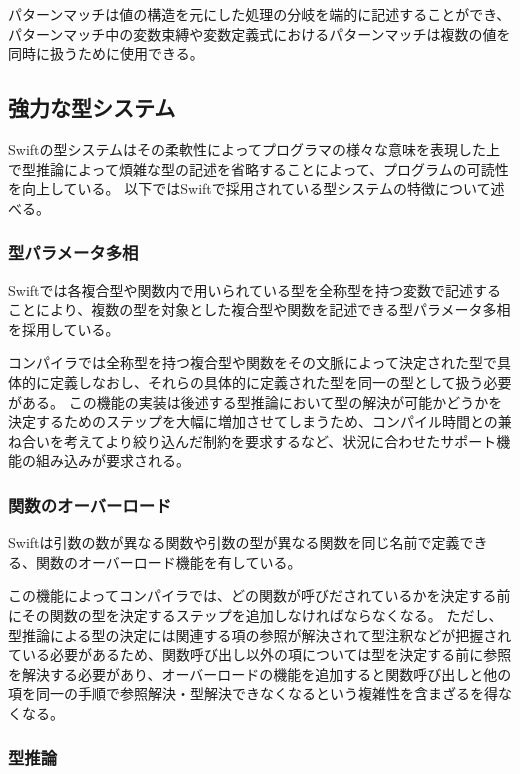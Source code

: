 パターンマッチは値の構造を元にした処理の分岐を端的に記述することができ、パターンマッチ中の変数束縛や変数定義式におけるパターンマッチは複数の値を同時に扱うために使用できる。


\subsection{強力な型システム}

Swiftの型システムはその柔軟性によってプログラマの様々な意味を表現した上で型推論によって煩雑な型の記述を省略することによって、プログラムの可読性を向上している。
以下ではSwiftで採用されている型システムの特徴について述べる。

\subsubsection{型パラメータ多相}

Swiftでは各複合型や関数内で用いられている型を全称型を持つ変数で記述することにより、複数の型を対象とした複合型や関数を記述できる型パラメータ多相を採用している。

コンパイラでは全称型を持つ複合型や関数をその文脈によって決定された型で具体的に定義しなおし、それらの具体的に定義された型を同一の型として扱う必要がある。
この機能の実装は後述する型推論において型の解決が可能かどうかを決定するためのステップを大幅に増加させてしまうため、コンパイル時間との兼ね合いを考えてより絞り込んだ制約を要求するなど、状況に合わせたサポート機能の組み込みが要求される。

\subsubsection{関数のオーバーロード}

Swiftは引数の数が異なる関数や引数の型が異なる関数を同じ名前で定義できる、関数のオーバーロード機能を有している。

この機能によってコンパイラでは、どの関数が呼びだされているかを決定する前にその関数の型を決定するステップを追加しなければならなくなる。
ただし、型推論による型の決定には関連する項の参照が解決されて型注釈などが把握されている必要があるため、関数呼び出し以外の項については型を決定する前に参照を解決する必要があり、オーバーロードの機能を追加すると関数呼び出しと他の項を同一の手順で参照解決・型解決できなくなるという複雑性を含まざるを得なくなる。

\subsubsection{型推論}

